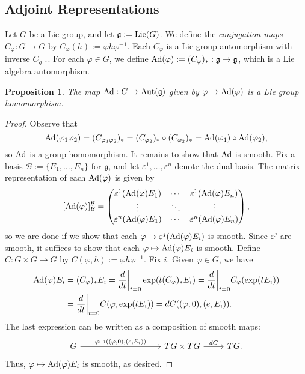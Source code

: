 \documentclass{amsart}
\newcommand{\lie}{\text{\normalfont Lie}}
\newcommand{\aut}{\text{\normalfont Aut}}
\newcommand{\Ad}{\text{\normalfont Ad}}
\newcommand{\g}{\mathfrak g}
\theoremstyle{plain}
\newtheorem{proposition}[theorem]{Proposition}
\theoremstyle{definition}
\theoremstyle{remark}
\begin{document}
	\subsection{Adjoint Representations}
	Let $G$ be a Lie group, and let $\g := \lie(G)$. We define the \emph{conjugation maps} $C_\varphi:G \rightarrow G$ by $C_\varphi(h) := \varphi h \varphi^{-1}$. Each $C_\varphi$ is a Lie group automorphism with inverse $C_{g^{-1}}$. For each $\varphi \in G$, we define $\Ad(\varphi) := (C_\varphi)_*:\g \rightarrow \g$, which is a Lie algebra automorphism.
	
	\begin{proposition}
		The map $\Ad:G \rightarrow \aut(\g)$ given by $\varphi \mapsto \Ad(\varphi)$ is a Lie group homomorphism.
	\end{proposition}
	\begin{proof}
		Observe that 
		$$\Ad(\varphi_1 \varphi_2) = (C_{\varphi_1 \varphi_2})_* = (C_{\varphi_2})_* \circ (C_{\varphi_2})_* = \Ad(\varphi_1) \circ \Ad(\varphi_2),$$
		so $\Ad$ is a group homomorphism. It remains to show that $\Ad$ is smooth. Fix a basis $\mathcal B := \{E_1,\ldots,E_n\}$ for $\g$, and let $\varepsilon^1,\ldots,\varepsilon^n$ denote the dual basis. The matrix representation of each $\Ad(\varphi)$ is given by 
		$$[\Ad(\varphi)]_{\mathcal B}^{\mathcal B} = \begin{pmatrix}
			 \varepsilon^1(\Ad(\varphi) E_1) & \cdots &  \varepsilon^1(\Ad(\varphi) E_n)\\
			 \vdots & \ddots & \vdots \\
			  \varepsilon^n(\Ad(\varphi) E_1) & \cdots &  \varepsilon^n(\Ad(\varphi) E_n)
		\end{pmatrix},$$
		so we are done if we show that each $\varphi \mapsto \varepsilon^j(\Ad(\varphi) E_i)$ is smooth. Since $\varepsilon^j$ are smooth, it suffices to show that each $\varphi \mapsto \Ad(\varphi) E_i$ is smooth. Define $C:G \times G \rightarrow G$ by $C(\varphi,h) := \varphi h \varphi^{-1}$. Fix $i$. Given $\varphi \in G$, we have 
		\begin{align*}
			\Ad(\varphi) E_i &= (C_\varphi)_* E_i = \frac{d}{dt}\bigg|_{t=0}\exp(t (C_\varphi)_* E_i)= \frac{d}{dt}\bigg|_{t = 0}C_\varphi (\exp(tE_i)) \\&= 
			\frac{d}{dt}\bigg|_{t = 0} C(\varphi, \exp(tE_i)) = dC((\varphi,0),(e,E_i)).
		\end{align*}
		The last expression can be written as a composition of smooth maps:
		$$\begin{tikzcd}
			G \arrow{rrrr}{\varphi \mapsto((\varphi,0),(e,E_i)) }&&&& TG \times TG \arrow{r}{dC}&TG.
		\end{tikzcd}$$
		Thus, $\varphi \mapsto \Ad(\varphi) E_i$ is smooth, as desired.
	\end{proof}
\end{document}
